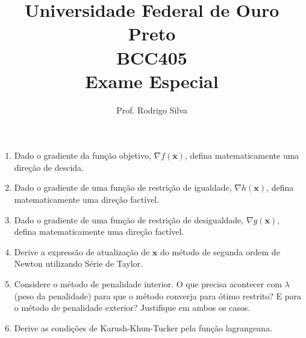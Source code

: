 \documentclass{article}
\title{\vspace{-2 cm}Universidade Federal de Ouro Preto \\ BCC405 \\ Exame Especial}
\author{Prof. Rodrigo Silva}
\begin{document}
\maketitle




\begin{enumerate}
    \item Dado o gradiente da função objetivo, $\nabla f(\mathbf{x})$, defina matematicamente uma direção de descida. 
    \item Dado o gradiente de uma função de restrição de igualdade, $\nabla h(\mathbf{x})$, defina matematicamente uma direção factível.
    \item Dado o gradiente de uma função de restrição de desigualdade, $\nabla g(\mathbf{x})$, defina matematicamente uma direção factível.
    \item Derive a expressão de atualização de $\mathbf{x}$ do método de segunda ordem de Newton utilizando Série de Taylor.
    \item Considere o método de penalidade interior. O que precisa acontecer com $\lambda$ (peso da penalidade) para que o método converja para ótimo restrito? E para o método de penalidade exterior? Justifique em ambos os casos. 
    \item Derive as condições de Karush-Khun-Tucker pela função lagrangeana. 
\end{enumerate}




%
%
\end{document}
